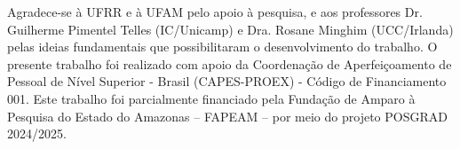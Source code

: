 \documentclass[12pt]{article}
\begin{document}

Agradece-se à UFRR e à UFAM pelo apoio à pesquisa, e aos professores Dr. Guilherme Pimentel Telles (IC/Unicamp) e Dra. Rosane Minghim (UCC/Irlanda) pelas ideias fundamentais que possibilitaram o desenvolvimento do trabalho.
O presente trabalho foi realizado com apoio da Coordenação de Aperfeiçoamento de Pessoal de Nível Superior - Brasil (CAPES-PROEX) - Código de Financiamento 001. Este trabalho foi parcialmente financiado pela Fundação de Amparo à Pesquisa do Estado do Amazonas – FAPEAM – por meio do projeto POSGRAD 2024/2025.




\end{document}
